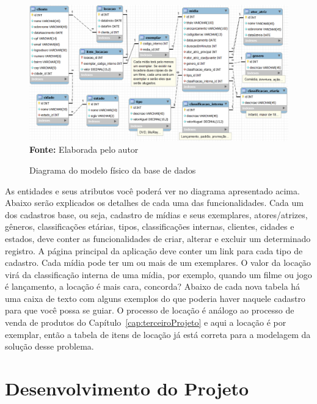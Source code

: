 \FloatBarrier
\begin{figure}[!htbp]
    \centering
    \caption{Diagrama do modelo físico da base de dados}
    \includegraphics[scale=0.5]{imagens/cap09ModeloFisico}
    \\\textbf{Fonte:} Elaborada pelo autor
    \label{fig:cap09ModeloFisico}
\end{figure}
\FloatBarrier

As entidades e seus atributos você poderá ver no diagrama apresentado acima. Abaixo serão explicados os detalhes de cada uma das funcionalidades. Cada um dos cadastros base, ou seja, cadastro de mídias e seus exemplares, atores/atrizes, gêneros, classificações etárias, tipos, classificações internas, clientes, cidades e estados, deve conter as funcionalidades de criar, alterar e excluir um determinado registro. A página principal da aplicação deve conter um link para cada tipo de cadastro. Cada mídia pode ter um ou mais de um exemplares. O valor da locação virá da classificação interna de uma mídia, por exemplo, quando um filme ou jogo é lançamento, a locação é mais cara, concorda? Abaixo de cada nova tabela há uma caixa de texto com alguns exemplos do que poderia haver naquele cadastro para que você possa se guiar. O processo de locação é análogo ao processo de venda de produtos do Capítulo~\ref{cap:terceiroProjeto} e aqui a locação é por exemplar, então a tabela de itens de locação já está correta para a modelagem da solução desse problema.


\section{Desenvolvimento do Projeto}

